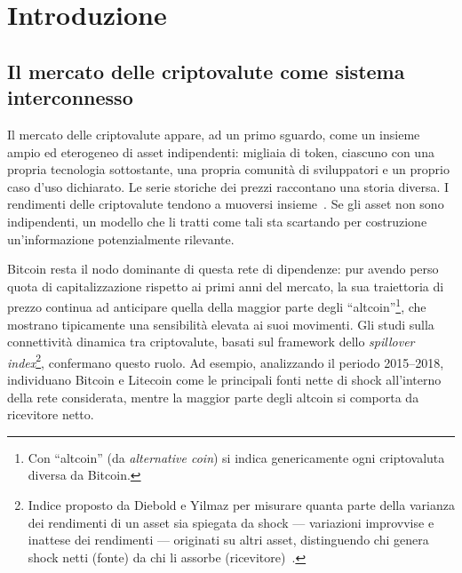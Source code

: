 \chapter*{Introduzione}
\label{ch:introduction}

\let\oldthesection\thesection
\renewcommand{\thesection}{\arabic{section}}

\section{Il mercato delle criptovalute come sistema interconnesso}
\label{sec:crypto-market-interconnected}

Il mercato delle criptovalute appare, ad un primo sguardo, come un insieme ampio ed eterogeneo di asset indipendenti: migliaia di token, ciascuno con una propria tecnologia sottostante, una propria comunità di sviluppatori e un proprio caso d'uso dichiarato. Le serie storiche dei prezzi raccontano una storia diversa. I rendimenti delle criptovalute tendono a muoversi insieme~\cite{ji2019dynamic}. Se gli asset non sono indipendenti, un modello che li tratti come tali sta scartando per costruzione un'informazione potenzialmente rilevante.

Bitcoin resta il nodo dominante di questa rete di dipendenze: pur avendo perso quota di capitalizzazione rispetto ai primi anni del mercato, la sua traiettoria di prezzo continua ad anticipare quella della maggior parte degli \enquote{altcoin}\footnote{Con \enquote{altcoin} (da \emph{alternative coin}) si indica genericamente ogni criptovaluta diversa da Bitcoin.}, che mostrano tipicamente una sensibilità elevata ai suoi movimenti. Gli studi sulla connettività dinamica tra criptovalute, basati sul framework dello \emph{spillover index}\footnote{Indice proposto da Diebold e Yilmaz per misurare quanta parte della varianza dei rendimenti di un asset sia spiegata da shock — variazioni improvvise e inattese dei rendimenti — originati su altri asset, distinguendo chi genera shock netti (fonte) da chi li assorbe (ricevitore)~\cite{dieboldyilmaz2012spillover}.}, confermano questo ruolo. Ad esempio, analizzando il periodo 2015--2018, \textcite{ji2019dynamic} individuano Bitcoin e Litecoin come le principali fonti nette di shock all'interno della rete considerata, mentre la maggior parte degli altcoin si comporta da ricevitore netto.

